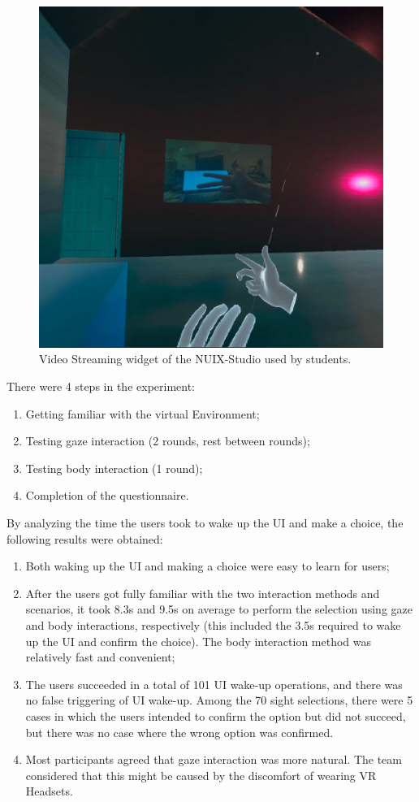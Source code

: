\begin{figure}
  \centering
  \includegraphics[width=0.6\linewidth]{figures/VideoStreamingWidget.png}
  \caption{Video Streaming widget of the NUIX-Studio used by students.}
  \label{fig:VideoStreamingWidget-figure}
\end{figure}

There were 4 steps in the experiment:
\begin{enumerate}
    \item Getting familiar with the virtual Environment;
    \item Testing gaze interaction (2 rounds, rest between rounds);
    \item Testing body interaction (1 round);
    \item Completion of the questionnaire.
\end{enumerate}

By analyzing the time the users took to wake up the UI and make a choice, the following results were obtained:
\begin{enumerate}
    \item Both waking up the UI and making a choice were easy to learn for users;
    \item After the users got fully familiar with the two interaction methods and scenarios, it took 8.3s and 9.5s on average to perform the selection using gaze and body interactions, respectively (this included the 3.5s required to wake up the UI and confirm the choice). The body interaction method was relatively fast and convenient;
    \item The users succeeded in a total of 101 UI wake-up operations, and there was no false triggering of UI wake-up. Among the 70 sight selections, there were 5 cases in which the users intended to confirm the option but did not succeed, but there was no case where the wrong option was confirmed. 
    \item Most participants agreed that gaze interaction was more natural. The team considered that this might be caused by the discomfort of wearing VR Headsets.
\end{enumerate}


